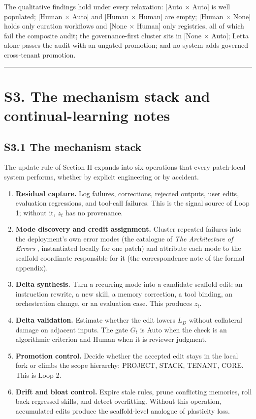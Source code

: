 \documentclass[
]{article}
\providecommand{\tightlist}{%
  \setlength{\itemsep}{0pt}\setlength{\parskip}{0pt}}
\begin{document}
The qualitative findings hold under every relaxation: {[}Auto × Auto{]}
is well populated; {[}Human × Auto{]} and {[}Human × Human{]} are empty;
{[}Human × None{]} holds only curation workflows and {[}None × Human{]}
only registries, all of which fail the composite audit; the
governance-first cluster sits in {[}None × Auto{]}; Letta alone passes
the audit with an ungated promotion; and no system adds governed
cross-tenant promotion.

\begin{center}\rule{0.5\linewidth}{0.5pt}\end{center}

\section{S3. The mechanism stack and continual-learning
notes}\label{s3.-the-mechanism-stack-and-continual-learning-notes}

\subsection{S3.1 The mechanism stack}\label{s3.1-the-mechanism-stack}

The update rule of Section II expands into six operations that every
patch-local system performs, whether by explicit engineering or by
accident.

\begin{enumerate}
\def\labelenumi{\arabic{enumi}.}
\tightlist
\item
  \textbf{Residual capture.} Log failures, corrections, rejected
  outputs, user edits, evaluation regressions, and tool-call failures.
  This is the signal source of Loop 1; without it, \(z_t\) has no
  provenance.
\item
  \textbf{Mode discovery and credit assignment.} Cluster repeated
  failures into the deployment's own error modes (the catalogue of
  \emph{The Architecture of Errors} \cite{arbuzov2026architecture},
  instantiated locally for one patch) and attribute each mode to the
  scaffold coordinate responsible for it (the correspondence note of the
  formal appendix).
\item
  \textbf{Delta synthesis.} Turn a recurring mode into a candidate
  scaffold edit: an instruction rewrite, a new skill, a memory
  correction, a tool binding, an orchestration change, or an evaluation
  case. This produces \(z_t\).
\item
  \textbf{Delta validation.} Estimate whether the edit lowers \(L_D\)
  without collateral damage on adjacent inputs. The gate \(G_t\) is Auto
  when the check is an algorithmic criterion and Human when it is
  reviewer judgment.
\item
  \textbf{Promotion control.} Decide whether the accepted edit stays in
  the local fork or climbs the scope hierarchy: PROJECT, STACK, TENANT,
  CORE. This is Loop 2.
\item
  \textbf{Drift and bloat control.} Expire stale rules, prune
  conflicting memories, roll back regressed skills, and detect
  overfitting. Without this operation, accumulated edits produce the
  scaffold-level analogue of plasticity loss.
\end{enumerate}
\end{document}
